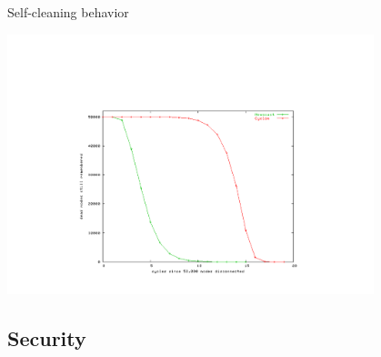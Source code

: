 \begin{frame}{Self-cleaning behavior}
	
\begin{center}
\includegraphics[width=0.8\textwidth]{clean}	
\end{center}
	
\end{frame}

\subsection{Security}

